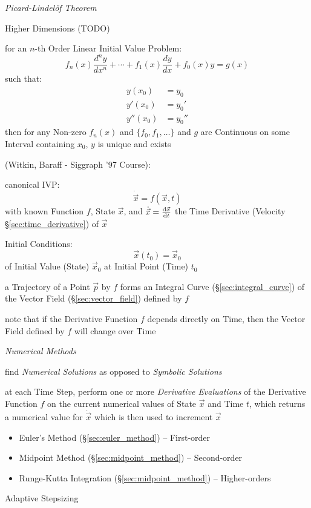 \emph{Picard-Lindel\"of Theorem}

Higher Dimensions (TODO)

for an $n$-th Order Linear Initial Value Problem:
\[
  f_n(x)\frac{d^ny}{dx^n} + \cdots + f_1(x)\frac{dy}{dx} + f_0(x)y = g(x)
\]
such that:
\begin{align*}
  y(x_0)   & = y_0   \\
  y'(x_0)  & = y_0'  \\
  y''(x_0) & = y_0''
\end{align*}
then for any Non-zero $f_n(x)$ and $\{f_0,f_1,\ldots\}$ and $g$ are Continuous
on some Interval containing $x_0$, $y$ is unique and exists

(Witkin, Baraff - Siggraph '97 Course):

canonical IVP:
\[
  \dot{\vec{x}} = f(\vec{x}, t)
\]
with known Function $f$, State $\vec{x}$, and $\dot{\vec{x}} =
\frac{\mathrm{d}\vec{x}}{\mathrm{d}t}$ the Time Derivative (Velocity \S\ref{sec:time_derivative})
of $\vec{x}$

Initial Conditions:
\[
  \vec{x}(t_0) = \vec{x}_0
\]
of Initial Value (State) $\vec{x}_0$ at Initial Point (Time) $t_0$

a Trajectory of a Point $\vec{p}$ by $f$ forms an Integral Curve
(\S\ref{sec:integral_curve}) of the Vector Field (\S\ref{sec:vector_field})
defined by $f$

note that if the Derivative Function $f$ depends directly on Time, then the
Vector Field defined by $f$ will change over Time

\emph{Numerical Methods}

find \emph{Numerical Solutions} as opposed to \emph{Symbolic Solutions}

at each Time Step, perform one or more \emph{Derivative Evaluations} of the
Derivative Function $f$ on the current numerical values of State $\vec{x}$ and
Time $t$, which returns a numerical value for $\dot{\vec{x}}$ which is then used
to increment $\vec{x}$

\begin{itemize}
\item Euler's Method (\S\ref{sec:euler_method}) -- First-order
\item Midpoint Method (\S\ref{sec:midpoint_method}) -- Second-order
\item Runge-Kutta Integration (\S\ref{sec:midpoint_method}) -- Higher-orders
\end{itemize}

Adaptive Stepsizing




